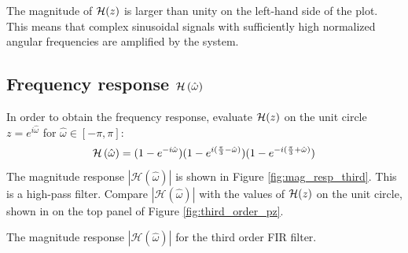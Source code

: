 The magnitude of $\mathcal{H}(z)$ is larger than unity on the left-hand side of
the plot. This means that complex sinusoidal signals with sufficiently
high normalized angular frequencies are amplified by the system.




\subsection{Frequency response $\mathcal{H}\left(\hat{\omega}\right)$}

In order to obtain the frequency response, evaluate $\mathcal{H}(z)$ on the unit
circle $z=e^{i\hat{\omega}}$ for $\hat{\omega}\in[-\pi,\pi]$:
\begin{equation}
  \mathcal{H}\left(\hat{\omega}\right) = (1-e^{-i\hat{\omega}})(1-e^{i(\frac{\pi}{3}-\hat{\omega})})(1-e^{-i(\frac{\pi}{3}+\hat{\omega})})
\end{equation}
The magnitude response $|\mathcal{H}(\hat{\omega})|$ is shown in Figure
\ref{fig:mag_resp_third}. This is a high-pass filter. Compare
$|\mathcal{H}(\hat{\omega})|$ with the values of $\mathcal{H}(z)$ on the unit
circle, shown in on the top panel of Figure \ref{fig:third_order_pz}.


\begin{marginfigure}
  \begin{center}
  \end{center}
  \caption{The magnitude response $|\mathcal{H}(\hat{\omega})|$ for the third order FIR filter.}
  \label{fig:mag_resp_third}
\end{marginfigure}

